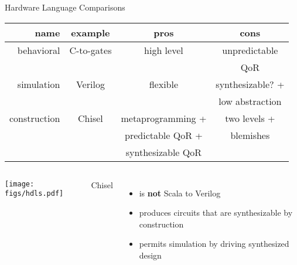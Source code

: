 \begin{frame}[fragile]{Hardware Language Comparisons}
\begin{small}
\begin{center}
\begin{tabular}{|r|c|c|c|}
\hline
{\bf name} & {\bf example} & {\bf pros} & {\bf cons} \\ 
\hline
{\color{magenta}behavioral} & C-to-gates & high level & unpredictable \\
 &  &  & QoR \\
\hline
{\color{orange}simulation} & Verilog & flexible & synthesizable? + \\
 &  &  & low abstraction \\
\hline
{\color{green}construction} & Chisel & metaprogramming + & two levels + \\
 &  & predictable QoR + & blemishes \\
 &  &  synthesizable QoR &  \\
\hline
\end{tabular}
\end{center}
\end{small}

\begin{columns}
\begin{center}
\texttt{[image: figs/hdls.pdf]} 
\end{center}
Chisel
\begin{itemize}
\item is {\bf not} Scala to Verilog
\item produces circuits that are synthesizable by construction
\item permits simulation by driving synthesized design
\end{itemize}
\end{columns}
\end{frame}
